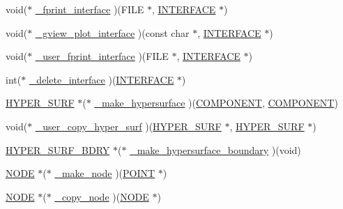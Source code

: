 \begin{DoxyCompactItemize}
\item 
void($\ast$ \hyperlink{struct___i___u_s_e_r___i_n_t_e_r_f_a_c_e_aaa5a9dc590b1b312be015418d974b75d}{\+\_\+fprint\+\_\+interface} )(F\+I\+LE $\ast$, \hyperlink{int_8h_a58cf562d0d320a608294b7310ea167dc}{I\+N\+T\+E\+R\+F\+A\+CE} $\ast$)
\item 
void($\ast$ \hyperlink{struct___i___u_s_e_r___i_n_t_e_r_f_a_c_e_aa0f546fb9fbf6e2a3b28007c09547f57}{\+\_\+gview\+\_\+plot\+\_\+interface} )(const char $\ast$, \hyperlink{int_8h_a58cf562d0d320a608294b7310ea167dc}{I\+N\+T\+E\+R\+F\+A\+CE} $\ast$)
\item 
void($\ast$ \hyperlink{struct___i___u_s_e_r___i_n_t_e_r_f_a_c_e_a64c589b7b078d38119fc5a168d605edd}{\+\_\+user\+\_\+fprint\+\_\+interface} )(F\+I\+LE $\ast$, \hyperlink{int_8h_a58cf562d0d320a608294b7310ea167dc}{I\+N\+T\+E\+R\+F\+A\+CE} $\ast$)
\item 
int($\ast$ \hyperlink{struct___i___u_s_e_r___i_n_t_e_r_f_a_c_e_a4dbfcb20898b78ad9ee58c5a08b9120d}{\+\_\+delete\+\_\+interface} )(\hyperlink{int_8h_a58cf562d0d320a608294b7310ea167dc}{I\+N\+T\+E\+R\+F\+A\+CE} $\ast$)
\item 
\hyperlink{int_8h_acef50fa4757ce0d3f75c97fab5a175bc}{H\+Y\+P\+E\+R\+\_\+\+S\+U\+RF} $\ast$($\ast$ \hyperlink{struct___i___u_s_e_r___i_n_t_e_r_f_a_c_e_abfbf2381b29cbfe1f66019e7162b2e00}{\+\_\+make\+\_\+hypersurface} )(\hyperlink{int_8h_a2bb7be12ca59ea6443c8757df0a7c278}{C\+O\+M\+P\+O\+N\+E\+NT}, \hyperlink{int_8h_a2bb7be12ca59ea6443c8757df0a7c278}{C\+O\+M\+P\+O\+N\+E\+NT})
\item 
void($\ast$ \hyperlink{struct___i___u_s_e_r___i_n_t_e_r_f_a_c_e_aa97414e2a6e327c23a24d0f7a0e80283}{\+\_\+user\+\_\+copy\+\_\+hyper\+\_\+surf} )(\hyperlink{int_8h_acef50fa4757ce0d3f75c97fab5a175bc}{H\+Y\+P\+E\+R\+\_\+\+S\+U\+RF} $\ast$, \hyperlink{int_8h_acef50fa4757ce0d3f75c97fab5a175bc}{H\+Y\+P\+E\+R\+\_\+\+S\+U\+RF} $\ast$)
\item 
\hyperlink{int_8h_af8baa4a8a47d73916b1e80313460aac9}{H\+Y\+P\+E\+R\+\_\+\+S\+U\+R\+F\+\_\+\+B\+D\+RY} $\ast$($\ast$ \hyperlink{struct___i___u_s_e_r___i_n_t_e_r_f_a_c_e_af891bda981141ec6c7a7eb24cf7f2b46}{\+\_\+make\+\_\+hypersurface\+\_\+boundary} )(void)
\item 
\hyperlink{int_8h_a65acc517559b106aa8e5fe339247ddcd}{N\+O\+DE} $\ast$($\ast$ \hyperlink{struct___i___u_s_e_r___i_n_t_e_r_f_a_c_e_ab4bc1f1b7755daca7e45f6e0122a2060}{\+\_\+make\+\_\+node} )(\hyperlink{int_8h_a3a87c5c9d0146e30a4bf720f701e5a63}{P\+O\+I\+NT} $\ast$)
\item 
\hyperlink{int_8h_a65acc517559b106aa8e5fe339247ddcd}{N\+O\+DE} $\ast$($\ast$ \hyperlink{struct___i___u_s_e_r___i_n_t_e_r_f_a_c_e_a9aff6eed0a0acdde7ca88d28b4aa952d}{\+\_\+copy\+\_\+node} )(\hyperlink{int_8h_a65acc517559b106aa8e5fe339247ddcd}{N\+O\+DE} $\ast$)

\end{DoxyCompactItemize}
